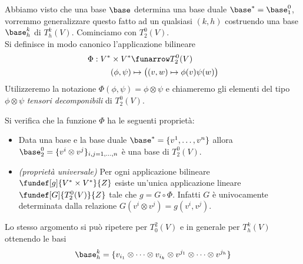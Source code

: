 \begin{defn} 
	Abbiamo visto che una base $\base$ determina una base duale $\base^* = \base_1^0$, vorremmo generalizzare questo fatto ad un qualsiasi $(k,h)$ costruendo una base $\base_h^k$ di $T_h^k(V)$. Cominciamo con $T_2^0(V)$. \\
Si definisce in modo canonico l'applicazione bilineare
\begin{align*}
	\Phi : V^* \times V^*  &\funarrow T_2^0(V) \\
			   (\phi,\psi) &\mapsto \big((v,w) \mapsto \phi(v)\psi(w)\big)
\end{align*}
Utilizzeremo la notazione $\Phi(\phi,\psi) = \phi \otimes \psi$ e chiameremo gli elementi del tipo $\phi \otimes \psi$ \emph{tensori decomponibili} di $T_2^0(V)$.

\noindent Si verifica che la funzione $\Phi$ ha le seguenti proprietà:
\begin{itemize}
\item Data una base e la base duale $\base^* = \{ v^1, \dots, v^n \}$ allora $\base_2^0 = \{ v^i \otimes v^j \}_{i,j = 1, \dots, n}$ è una base di $T_2^0(V)$.
\item \emph{(proprietà universale)} Per ogni applicazione bilineare $\fundef[g]{V^* \times V^*}{Z}$ esiste un'unica applicazione lineare $\fundef[G]{T_2^0(V)}{Z}$ tale che $g = G \circ \Phi$. Infatti $G$ è univocamente determinata dalla relazione $G(v^i \otimes v^j) = g(v^i,v^j)$.
\end{itemize}
Lo stesso argomento si può ripetere per $T_0^2(V)$ e in generale per $T_h^k(V)$ ottenendo le basi \[ \base_h^k = \{ v_{i_1} \otimes \dots \otimes v_{i_k} \otimes v^{j_1} \otimes \dots \otimes v^{j_h} \} \]
\end{defn}